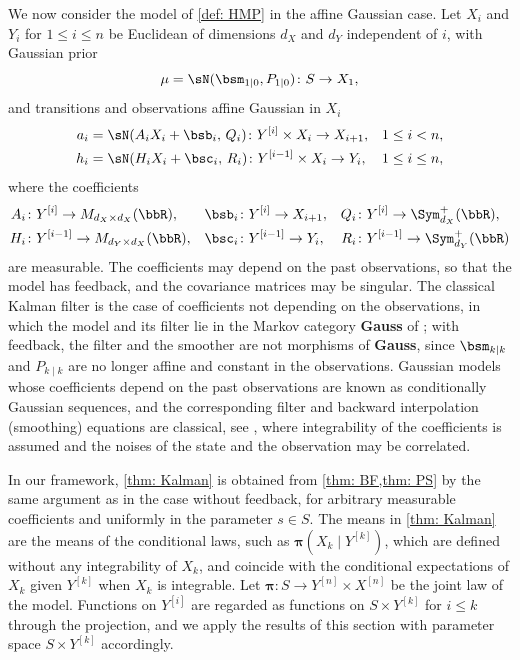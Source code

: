\documentclass[12pt,reqno]{amsart}%
\theoremstyle{plain}
\theoremstyle{definition}
\def\bspi{\boldsymbol{\pi}}
\def\R{\bbR}
\begin{document}
We now consider the model of \cref{def: HMP} in the affine Gaussian case.
Let $X_i$ and $Y_i$ for $1\leq i\leq n$ be Euclidean of dimensions $d_X$ and $d_Y$ independent of $i$,
with Gaussian prior
\[
	\mu=\sN(\bsm_{1\mid0},P_{1\mid0})\colon S\rightarrow X_1,
\]
and transitions and observations affine Gaussian in $X_i$
\begin{align*}
	a_i&=\sN(A_iX_i+\bsb_i,\,Q_i)\colon Y^{[i]}\times X_i\rightarrow X_{i+1},& 1\leq i<n,\\
	h_i&=\sN(H_iX_i+\bsc_i,\,R_i)\colon Y^{[i-1]}\times X_i\rightarrow Y_i,& 1\leq i\leq n,
\end{align*}
where the coefficients
\begin{align*}
	A_i&\colon Y^{[i]}\rightarrow M_{d_X\times d_X}(\R),& \bsb_i&\colon Y^{[i]}\rightarrow X_{i+1},& Q_i&\colon Y^{[i]}\rightarrow\Sym^+_{d_X}(\R),\\
	H_i&\colon Y^{[i-1]}\rightarrow M_{d_Y\times d_X}(\R),& \bsc_i&\colon Y^{[i-1]}\rightarrow Y_i,& R_i&\colon Y^{[i-1]}\rightarrow\Sym^+_{d_Y}(\R)
\end{align*}
are measurable.
The coefficients may depend on the past observations, so that the model has feedback,
and the covariance matrices may be singular.
The classical Kalman filter is the case of coefficients not depending on the observations,
in which the model and its filter lie in the Markov category \textbf{Gauss} of \cite[\S6]{F20};
with feedback, the filter and the smoother are not morphisms of \textbf{Gauss},
since $\bsm_{k\mid k}$ and $P_{k\mid k}$ are no longer affine and constant in the observations.
Gaussian models whose coefficients depend on the past observations are known as conditionally Gaussian sequences,
and the corresponding filter and backward interpolation (smoothing) equations are classical,
see \cite[Theorems~13.4 and~13.12]{LS01}, where integrability of the coefficients is assumed
and the noises of the state and the observation may be correlated.

In our framework, \cref{thm: Kalman} is obtained from \cref{thm: BF,thm: PS} by the same argument
as in the case without feedback, for arbitrary measurable coefficients and uniformly in the parameter $s\in S$.
The means in \cref{thm: Kalman} are the means of the conditional laws, such as $\bspi(X_k\mid Y^{[k]})$,
which are defined without any integrability of $X_k$,
and coincide with the conditional expectations of $X_k$ given $Y^{[k]}$ when $X_k$ is integrable.
Let $\bspi\colon S\rightarrow Y^{[n]}\times X^{[n]}$ be the joint law of the model.
Functions on $Y^{[i]}$ are regarded as functions on $S\times Y^{[k]}$ for $i\leq k$ through the projection,
and we apply the results of this section with parameter space $S\times Y^{[k]}$ accordingly.
\end{document}
